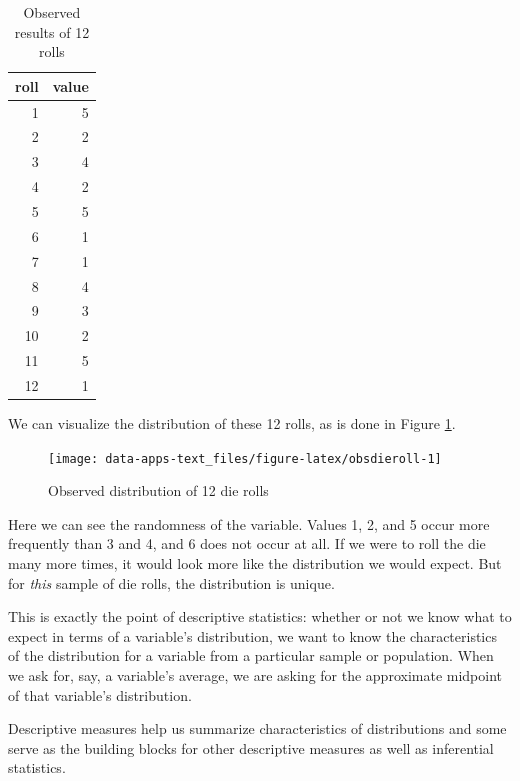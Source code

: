 \documentclass[
]{book}
\begin{document}
\begin{table}

\caption{\label{tab:obsdietable}Observed results of 12 rolls}
\centering
\begin{tabular}[t]{r|r}
\hline
roll & value\\
\hline
1 & 5\\
\hline
2 & 2\\
\hline
3 & 4\\
\hline
4 & 2\\
\hline
5 & 5\\
\hline
6 & 1\\
\hline
7 & 1\\
\hline
8 & 4\\
\hline
9 & 3\\
\hline
10 & 2\\
\hline
11 & 5\\
\hline
12 & 1\\
\hline
\end{tabular}
\end{table}

We can visualize the distribution of these 12 rolls, as is done in Figure \ref{fig:obsdieroll}.

\begin{figure}

{\centering \texttt{[image: data-apps-text\_files/figure-latex/obsdieroll-1]} 

}

\caption{Observed distribution of 12 die rolls}\label{fig:obsdieroll}
\end{figure}

Here we can see the randomness of the variable. Values 1, 2, and 5 occur more frequently than 3 and 4, and 6 does not occur at all. If we were to roll the die many more times, it would look more like the distribution we would expect. But for \emph{this} sample of die rolls, the distribution is unique.

This is exactly the point of descriptive statistics: whether or not we know what to expect in terms of a variable's distribution, we want to know the characteristics of the distribution for a variable from a particular sample or population. When we ask for, say, a variable's average, we are asking for the approximate midpoint of that variable's distribution.

Descriptive measures help us summarize characteristics of distributions and some serve as the building blocks for other descriptive measures as well as inferential statistics.
\end{document}
